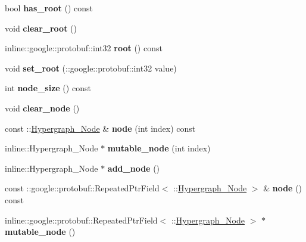 \begin{DoxyCompactItemize}
\item 
\hypertarget{classHypergraph_ab92016742525abd273fb96859b586bed}{
bool {\bfseries has\_\-root} () const }
\label{classHypergraph_ab92016742525abd273fb96859b586bed}

\item 
\hypertarget{classHypergraph_a2404b1cf118c4511b17748d23a51f9c3}{
void {\bfseries clear\_\-root} ()}
\label{classHypergraph_a2404b1cf118c4511b17748d23a51f9c3}

\item 
\hypertarget{classHypergraph_af86203cfb1b5ddbbd58cab35cc02b8c5}{
inline::google::protobuf::int32 {\bfseries root} () const }
\label{classHypergraph_af86203cfb1b5ddbbd58cab35cc02b8c5}

\item 
\hypertarget{classHypergraph_aa3a2d6876af145d4ccf600dbcfb2446d}{
void {\bfseries set\_\-root} (::google::protobuf::int32 value)}
\label{classHypergraph_aa3a2d6876af145d4ccf600dbcfb2446d}

\item 
\hypertarget{classHypergraph_ac07666e8012c320a265bb25842fa7238}{
int {\bfseries node\_\-size} () const }
\label{classHypergraph_ac07666e8012c320a265bb25842fa7238}

\item 
\hypertarget{classHypergraph_a85cd3d3e06c7cb448d1a1059f09f1b5d}{
void {\bfseries clear\_\-node} ()}
\label{classHypergraph_a85cd3d3e06c7cb448d1a1059f09f1b5d}

\item 
\hypertarget{classHypergraph_a72db8343ef7ab67b8cfbfffd7c83d472}{
const ::\hyperlink{classHypergraph__Node}{Hypergraph\_\-Node} \& {\bfseries node} (int index) const }
\label{classHypergraph_a72db8343ef7ab67b8cfbfffd7c83d472}

\item 
\hypertarget{classHypergraph_a6b45e9545d78b8cf17637b6ef71baa60}{
inline::Hypergraph\_\-Node $\ast$ {\bfseries mutable\_\-node} (int index)}
\label{classHypergraph_a6b45e9545d78b8cf17637b6ef71baa60}

\item 
\hypertarget{classHypergraph_abdaf30271c29d8d61c7e2fe77a392b10}{
inline::Hypergraph\_\-Node $\ast$ {\bfseries add\_\-node} ()}
\label{classHypergraph_abdaf30271c29d8d61c7e2fe77a392b10}

\item 
\hypertarget{classHypergraph_a07d32ac4f217954bc033d6a304445408}{
const ::google::protobuf::RepeatedPtrField$<$ ::\hyperlink{classHypergraph__Node}{Hypergraph\_\-Node} $>$ \& {\bfseries node} () const }
\label{classHypergraph_a07d32ac4f217954bc033d6a304445408}

\item 
\hypertarget{classHypergraph_a4ea0dbf6904be58bd8afc24ee7acb57d}{
inline::google::protobuf::RepeatedPtrField$<$ ::\hyperlink{classHypergraph__Node}{Hypergraph\_\-Node} $>$ $\ast$ {\bfseries mutable\_\-node} ()}
\label{classHypergraph_a4ea0dbf6904be58bd8afc24ee7acb57d}

\end{DoxyCompactItemize}
